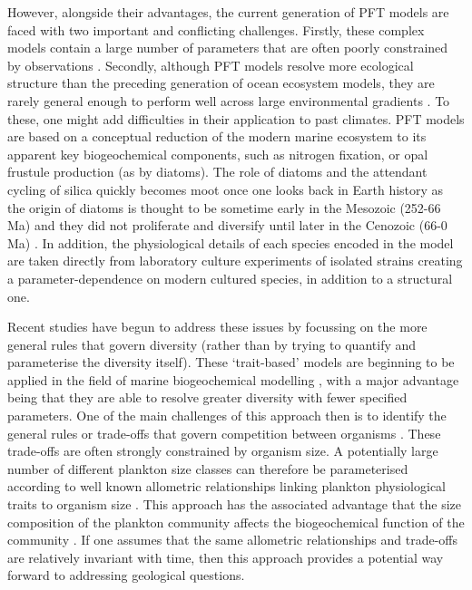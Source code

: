 \documentclass[gmd, manuscript]{copernicus}
\begin{document}
However, alongside their advantages, the current generation of PFT models are faced with two important and conflicting challenges. Firstly, these complex models contain a large number of parameters that are often poorly constrained by observations \citep{Anderson:2005}. Secondly, although PFT models resolve more ecological structure than the preceding generation of ocean ecosystem models, they are rarely general enough to perform well across large environmental gradients \citep{Friedrichs:2006,Friedrichs:2007,Ward:2010}. To these, one might add difficulties in their application to past climates. PFT models are based on a conceptual reduction of the modern marine ecosystem to its apparent key biogeochemical components, such as nitrogen fixation, or opal frustule production (as by diatoms). The role of diatoms and the attendant cycling of silica quickly becomes moot once one looks back in Earth history as the origin of diatoms is thought to be sometime early in the Mesozoic (252-66 Ma) and they did not proliferate and diversify until later in the Cenozoic (66-0 Ma) \citep{Falkowski:2004}. In addition, the physiological details of each species encoded in the model are  taken directly from laboratory culture experiments of isolated strains \citep{LeQuere:2005} creating a parameter-dependence on modern cultured species, in addition to a structural one. 

Recent studies have begun to address these issues by focussing on the more general rules that govern diversity (rather than by trying to quantify and parameterise the diversity itself). These `trait-based' models are beginning to be applied in the field of marine biogeochemical modelling \citep[e.g.][]{Follows:2007,Bruggeman:2007}, with a major advantage being that they are able to resolve greater diversity with fewer specified parameters. One of the main challenges of this approach then is to identify the general rules or trade-offs that govern competition between organisms \citep{Follows:2007,Litchman:2007}. These trade-offs are often strongly constrained by organism size. A potentially large number of different plankton size classes can therefore be parameterised according to well known allometric relationships linking plankton physiological traits to organism size \citep[e.g.][]{Tang:1995,Hansen:1997a}. This approach has the associated advantage that the size composition of the plankton community affects the biogeochemical function of the community \citep[e.g.][]{Guidi:2009}. If one assumes that the same allometric relationships and trade-offs are relatively invariant with time, then this approach provides a potential way forward to addressing geological questions. 
\end{document}
